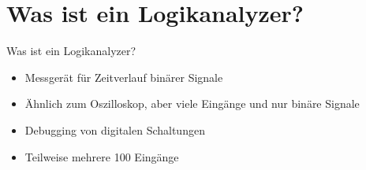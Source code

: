 \section{Was ist ein Logikanalyzer?}
\begin{frame}[<+->]{Was ist ein Logikanalyzer?}
    \begin{itemize}
        \item Messgerät für Zeitverlauf binärer Signale
        \item Ähnlich zum Oszilloskop, aber viele Eingänge und nur binäre Signale
        \item Debugging von digitalen Schaltungen
        \item Teilweise mehrere 100 Eingänge
    \end{itemize}
\end{frame}
